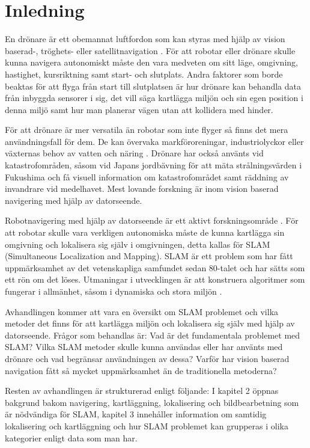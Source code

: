 \chapter{Inledning}

En drönare är ett obemannat luftfordon som kan styras med hjälp av vision baserad-, tröghets- eller satellitnavigation \citep{geospatial}. För att robotar eller drönare skulle kunna navigera autonomiskt måste den vara medveten om sitt läge, omgivning, hastighet, kursriktning samt start- och slutplats. Andra faktorer som borde beaktas för att flyga från start till slutplatsen är hur drönare kan behandla data från inbyggda sensorer i sig, det vill säga kartlägga miljön och sin egen position i denna miljö samt hur man planerar vägen utan att kollidera med hinder.

För att drönare är mer versatila än robotar som inte flyger så finns det mera användningsfall för dem. De kan övervaka markföroreningar, industriolyckor eller växternas behov av vatten och näring \citep{crowdsurveillance}. Drönare har också använts vid katastrofområden, såsom vid Japans jordbävning för att mäta strålningsvärden i Fukushima och få visuell information om katastrofområdet samt räddning av invandrare vid medelhavet. Mest lovande forskning är inom vision baserad navigering med hjälp av datorseende.

Robotnavigering med hjälp av datorseende är ett aktivt forskningsområde \citep{982903}. För att robotar skulle vara verkligen autonomiska måste de kunna kartlägga sin omgivning och lokalisera sig själv i omgivningen, detta kallas för SLAM (Simultaneous Localization and Mapping). SLAM är ett problem som har fått uppmärksamhet av det vetenskapliga samfundet sedan 80-talet och har sätts som ett rön om det löses. Utmaningar i utvecklingen är att konstruera algoritmer som fungerar i allmänhet, såsom i dynamiska och stora miljön \citep{realslamproblem}.

Avhandlingen kommer att vara en översikt om SLAM problemet och vilka metoder det finns för att kartlägga miljön och lokalisera sig själv med hjälp av datorseende. Frågor som behandlas är: Vad är det fundamentala problemet med SLAM? Vilka SLAM metoder skulle kunna användas eller har använts med drönare och vad begränsar användningen av dessa? Varför har vision baserad navigation fått så mycket uppmärksamhet än de traditionella metoderna?

Resten av avhandlingen är strukturerad enligt följande: I kapitel 2 öppnas bakgrund bakom navigering, kartläggning, lokalisering och bildbearbetning som är nödvändiga för SLAM, kapitel 3 innehåller information om samtidig lokalisering och kartläggning och hur SLAM problemet kan grupperas i olika kategorier enligt data som man har.

